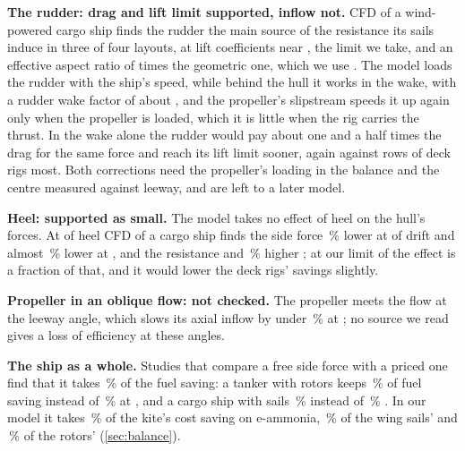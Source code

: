 \textbf{The rudder: drag and lift limit supported, inflow not.} CFD of a wind-powered cargo ship finds the rudder the main source of the resistance its sails induce in three of four layouts, at lift coefficients near , the limit we take, and an effective aspect ratio of  times the geometric one, which we use \citep{kramer2022}. The model loads the rudder with the ship's speed, while behind the hull it works in the wake, with a rudder wake factor of about  \citep{kramer2022}, and the propeller's slipstream speeds it up again only when the propeller is loaded, which it is little when the rig carries the thrust. In the wake alone the rudder would pay about one and a half times the drag for the same force and reach its lift limit sooner, again against rows of deck rigs most. Both corrections need the propeller's loading in the balance and the centre measured against leeway, and are left to a later model.

\textbf{Heel: supported as small.} The model takes no effect of heel on the hull's forces. At  of heel CFD of a cargo ship finds the side force \,\% lower at  of drift and almost \,\% lower at , and the resistance  and \,\% higher \citep{kramer2022b}; at our limit of  the effect is a fraction of that, and it would lower the deck rigs' savings slightly.

\textbf{Propeller in an oblique flow: not checked.} The propeller meets the flow at the leeway angle, which slows its axial inflow by under \,\% at ; no source we read gives a loss of efficiency at these angles.

\textbf{The ship as a whole.} Studies that compare a free side force with a priced one find that it takes \,\% of the fuel saving: a tanker with rotors keeps \,\% of fuel saving instead of \,\% at  \citep{tillig2019}, and a cargo ship with sails \,\% instead of \,\% \citep{kramer2022}. In our model it takes \NumSideForceKite\,\% of the kite's cost saving on e-ammonia, \NumSideForceWings\,\% of the wing sails' and \NumSideForceRotors\,\% of the rotors' (\cref{sec:balance}).

\begin{table}[tbp]
\centering
\caption{Side-force coefficient and induced-drag coefficient at that side force, both on $\tfrac12\rho_w V^2 L T$, of two hulls built without a skeg for wind propulsion: the fit to towing-tank tests at scale  \citep{vanderkolk2021} against the model's hull of the same length, beam, draught and block coefficient.}
\label{tab:drift_check}
\end{table}

